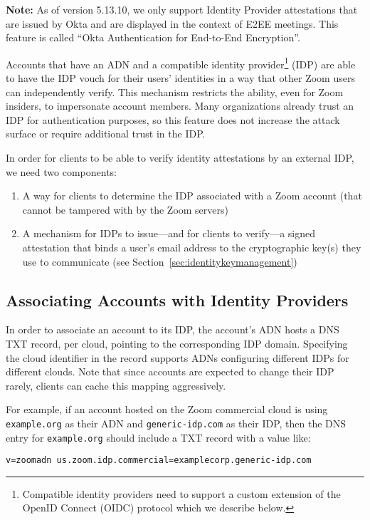 \textbf{Note:} As of version 5.13.10, we only support Identity Provider
attestations that are issued by Okta and are displayed in the context of E2EE meetings.
This feature is called ``Okta Authentication for End-to-End Encryption''.

Accounts that have an ADN and a compatible identity provider\footnote{Compatible
identity providers need to support a custom extension of the OpenID Connect
(OIDC) protocol which we describe below.} (IDP) are able to have the IDP vouch
for their users' identities in a way that other Zoom users can independently
verify. This mechanism restricts the ability, even for Zoom insiders, to
impersonate account members. Many organizations already trust an IDP for
authentication purposes, so this feature does not increase the attack surface or
require additional trust in the IDP.

In order for clients to be able to verify identity attestations by an external IDP, we need two
components:

\begin{enumerate}
\item A way for clients to determine the IDP associated with a Zoom account (that cannot be
    tampered with by the Zoom servers)
\item A mechanism for IDPs to issue---and for clients to verify---a signed attestation that binds
    a user's email address to the cryptographic key(s) they use to communicate (see Section~\ref{sec:identitykeymanagement})
\end{enumerate}

\subsection{Associating Accounts with Identity Providers}
\label{subsec:adnToIdp}
In order to associate an account to its IDP, the account's ADN hosts a DNS
TXT record, per cloud, pointing to the corresponding IDP domain. Specifying the
cloud identifier in the record supports ADNs configuring different IDPs for
different clouds. Note that since accounts are expected to change their IDP
rarely, clients can cache this mapping aggressively.

For example, if an account hosted on the Zoom commercial cloud is using 
\texttt{example.org} as their ADN and \texttt{generic-idp.com} as their IDP,
then the DNS entry for \texttt{example.org} should include a TXT record
with a value like:
\begin{center}
    \texttt{v=zoomadn us.zoom.idp.commercial=examplecorp.generic-idp.com}
\end{center}


